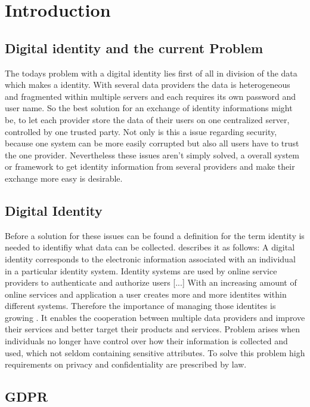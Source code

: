\chapter{Introduction}
\label{cha:introduction}
\section{Digital identity and the current Problem}\label{problem}

The todays problem with a digital identity lies first of all in division of the data which makes a identity. With several data providers the data is heterogeneous and fragmented within multiple servers and each requires its own password and user name. So the best solution for an exchange of identity informations might be, to let each provider store the data of their users on one centralized server, controlled by one trusted party. Not only is this a issue regarding security, because one system can be more easily corrupted but also all users have to trust the one provider.
Nevertheless these issues aren't simply solved, a overall system or framework to get identity information from several providers and make their exchange more easy is desirable. 

\section{Digital Identity}\label{digital_identity}
Before a solution for these issues can be found a definition for the term identity is needed to identifiy what data can be collected. \cite{digitalIdentityDefinition} describes it as follows: A digital identity corresponds to the electronic information associated with an individual in a particular identity system. Identity systems are used by online service providers to authenticate and authorize users [...]
With an increasing amount of online services and application a user creates more and more identites within different systems. Therefore the importance of managing those identites is growing \cite{managingIdentity} \label{managingIdentities}. 
It enables the cooperation between multiple data providers and improve their services and better target their products and services. Problem arises when individuals no longer have control over how their information is collected and used, which not seldom containing sensitive attributes. To solve this problem high requirements on privacy and confidentiality are prescribed by law.

\section{GDPR}\label{GDPR}

